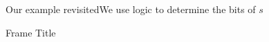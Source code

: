 


\begin{frame}{Our example revisited}{We use logic to determine the bits of $s$}

    
\end{frame}

\begin{frame}{Frame Title}

\begin{center}
\begin{DotPBox}{4}{0.5}{6}
\end{DotPBox} \\
\begin{DotPBox}{4}{0.5}{6}
\end{DotPBox}
\end{center}
    
\end{frame}